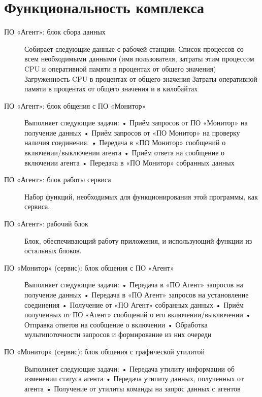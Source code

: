 \section{Функциональность комплекса }

\begin{description}

\item[ПО «Агент»: блок сбора данных]

Собирает следующие данные с рабочей станции: Список процессов со всем необходимыми данными (имя пользователя, затраты этим процессом CPU и оперативной памяти в процентах от общего значения) Загруженность CPU в процентах от общего значения Затраты оперативной памяти в процентах от общего значения и в килобайтах

\item[ПО «Агент»: блок общения с ПО «Монитор»]

Выполняет следующие задачи:
•	Приём запросов от ПО «Монитор» на получение данных 
•	Приём запросов от «ПО Монитор» на проверку наличия соединения.
•	Передача в «ПО Монитор» сообщений о включении/выключении агента 
•	Приём ответа на сообщение о включении агента
•	Передача в «ПО Монитор» собранных данных
\item[ПО «Агент»: блок работы сервиса]

Набор функций, необходимых для функционирования этой программы, как сервиса.

\item[ПО «Агент»: рабочий блок]

Блок, обеспечивающий работу приложения, и использующий функции из остальных блоков.

\item[ПО «Монитор» (сервис): блок общения с ПО «Агент»]

Выполняет следующие задачи:
•	Передача в «ПО Агент» запросов на получение данных
•	Передача в «ПО Агент» запросов на установление соединения
•	Получение от «ПО Агент» собранных данных
•	Приём полученных от ПО «Агент» сообщений о его включении/выключении 
•	Отправка ответов на сообщение о включении
•	Обработка мультипоточности запросов и формирование из них очереди

\item[ПО «Монитор» (сервис): блок общения с графической утилитой]

Выполняет следующие задачи:
•	Передача утилиту информации об изменении статуса агента
•	Передача утилиту данных, полученных от агента
•	Получение от утилиты команды на запрос данных с агентов


\end{description}
